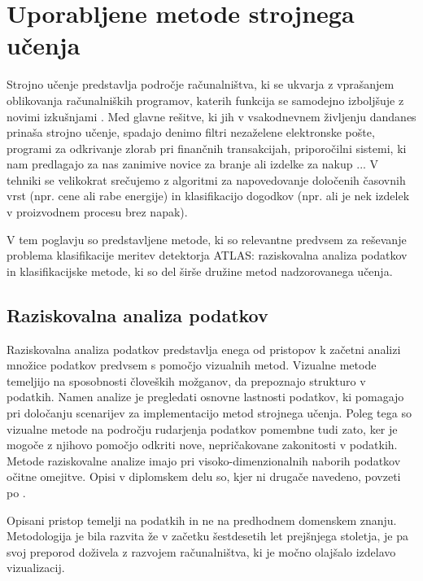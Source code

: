 \documentclass[11pt,a4paper,openany]{book}
\begin{document}
\chapter{Uporabljene metode strojnega učenja}

Strojno učenje predstavlja področje računalništva, ki se ukvarja z vprašanjem oblikovanja računalniških programov, katerih funkcija se samodejno izboljšuje z novimi izkušnjami \cite{Mitchell1997, Witten2005}. Med glavne rešitve, ki jih v vsakodnevnem življenju dandanes prinaša strojno učenje, spadajo denimo filtri nezaželene elektronske pošte, programi za odkrivanje zlorab pri finančnih transakcijah, priporočilni sistemi, ki nam predlagajo za nas zanimive novice za branje ali izdelke za nakup ... V tehniki se velikokrat srečujemo z algoritmi za napovedovanje določenih časovnih vrst (npr. cene ali rabe energije) in klasifikacijo dogodkov (npr. ali je nek izdelek v proizvodnem procesu brez napak).

V tem poglavju so predstavljene metode, ki so relevantne predvsem za reševanje problema klasifikacije meritev detektorja ATLAS: raziskovalna analiza podatkov in klasifikacijske metode, ki so del širše družine metod nadzorovanega učenja. 

\section{Raziskovalna analiza podatkov}
Raziskovalna analiza podatkov predstavlja enega od pristopov k začetni analizi množice podatkov predvsem s pomočjo vizualnih metod. Vizualne metode temeljijo na sposobnosti človeških možganov, da prepoznajo strukturo v podatkih. Namen analize je pregledati osnovne lastnosti podatkov, ki pomagajo pri določanju scenarijev za implementacijo metod strojnega učenja. Poleg tega so vizualne metode na področju rudarjenja podatkov pomembne tudi zato, ker je mogoče z njihovo pomočjo odkriti nove, nepričakovane zakonitosti v podatkih. Metode raziskovalne analize imajo pri visoko-dimenzionalnih naborih podatkov očitne omejitve. Opisi v diplomskem delu so, kjer ni drugače navedeno, povzeti po \cite{hand2001}.

Opisani pristop temelji na podatkih in ne na predhodnem domenskem znanju. Metodologija je bila razvita že v začetku šestdesetih let prejšnjega stoletja, je pa svoj preporod doživela z razvojem računalništva, ki je močno olajšalo izdelavo vizualizacij. 
\end{document}
